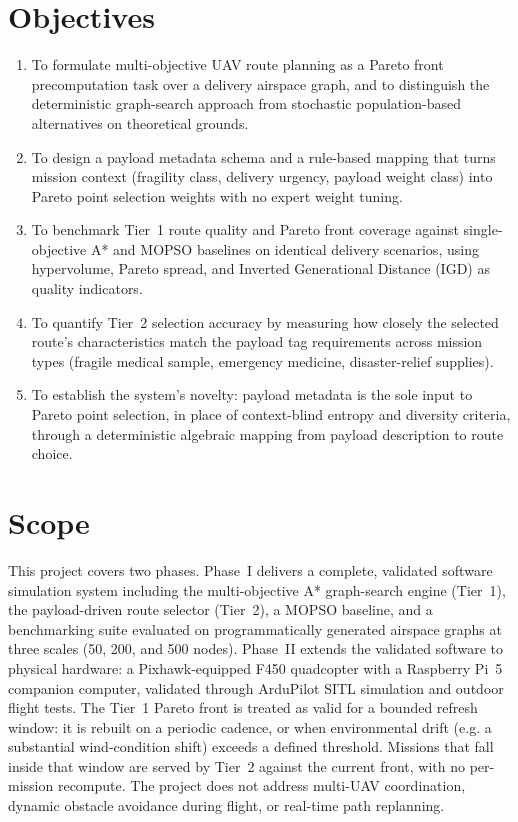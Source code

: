 \documentclass{ssnreview}
\begin{document}
\section{Objectives}
\begin{enumerate}[label=\arabic*.]
  \item To formulate multi-objective UAV route planning as a Pareto front
  precomputation task over a delivery airspace graph, and to distinguish the
  deterministic graph-search approach from stochastic population-based alternatives
  on theoretical grounds.
  \item To design a payload metadata schema and a rule-based mapping that turns mission
  context (fragility class, delivery urgency, payload weight class) into Pareto point
  selection weights with no expert weight tuning.
  \item To benchmark Tier~1 route quality and Pareto front coverage against
  single-objective A* and MOPSO baselines on identical delivery scenarios, using
  hypervolume, Pareto spread, and Inverted Generational Distance (IGD) as quality
  indicators.
  \item To quantify Tier~2 selection accuracy by measuring how closely the selected
  route's characteristics match the payload tag requirements across mission types
  (fragile medical sample, emergency medicine, disaster-relief supplies).
  \item To establish the system's novelty: payload metadata is the sole input to Pareto
  point selection, in place of context-blind entropy and diversity criteria, through a
  deterministic algebraic mapping from payload description to route choice.
\end{enumerate}

\section{Scope}

This project covers two phases. Phase~I delivers a complete, validated software
simulation system including the multi-objective A* graph-search engine (Tier~1), the
payload-driven route selector (Tier~2), a MOPSO baseline, and a benchmarking suite
evaluated on programmatically generated airspace graphs at three scales (50, 200, and
500 nodes). Phase~II extends the validated software to physical hardware: a
Pixhawk-equipped F450 quadcopter with a Raspberry Pi~5 companion computer, validated
through ArduPilot SITL simulation and outdoor flight tests. The Tier~1 Pareto front is
treated as valid for a bounded refresh window: it is rebuilt on a periodic cadence, or
when environmental drift (e.g. a substantial wind-condition shift) exceeds a defined
threshold. Missions that fall inside that window are served by Tier~2 against the current
front, with no per-mission recompute.
The project does not address multi-UAV coordination, dynamic obstacle avoidance during
flight, or real-time path replanning.
\end{document}

